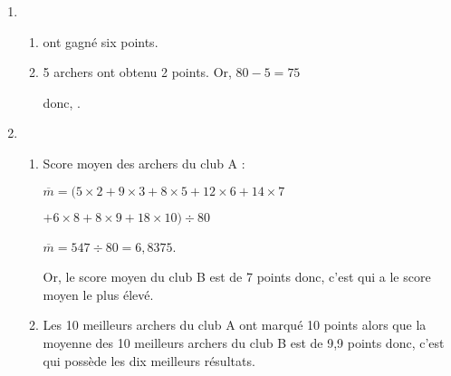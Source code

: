 \begin{Maquette}[Fiche,CorrigeFin,Colonnes=2]{}
\begin{multicols}{2}
      \begin{Solution}
         \begin{enumerate}
            \item
               \begin{enumerate}
                  \item {} ont gagné six points.
                  \item 5 archers ont obtenu 2 points. Or, $80-5 =75$ \par
                     donc, .
               \end{enumerate}
            \item 
               \begin{enumerate}
                  \item Score moyen des archers du club A : \par
                     $\overline{m} =(5\times2+9\times3+8\times5+12\times6+14\times7$ \par
                     $+6\times8+8\times9+18\times10)\div80$ \par
                     $\overline{m} =547\div80 =6,8375$. \par
                     Or, le score moyen du club B est de 7 points donc, c'est  qui a le score moyen le plus élevé.
                  \item Les 10 meilleurs archers du club A ont marqué 10 points alors que la moyenne des 10 meilleurs archers du club B est de 9,9 points donc, c'est  qui possède les dix meilleurs résultats.
               \end{enumerate}
         \end{enumerate}
      \end{Solution}
          

\end{multicols}
\end{Maquette}
